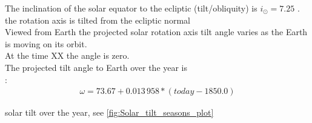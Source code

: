 The inclination of the solar equator to the ecliptic (tilt/obliquity) is $i_\odot = 7.25$\textdegree{} \citep{USNO2015}.\\	%

the rotation axis is tilted from the ecliptic normal\\


Viewed from Earth the projected solar rotation axis tilt angle varies as the Earth is moving on its orbit.\\

At the time XX the angle is zero.\\

The projected tilt angle to Earth over the year is\\

% 
% 

\citet{Hapgood1992}:
\begin{align}
	\omega = 73.67 + 0.013\,958 * (today - 1850.0)	%
\end{align}
% 
% 


% 

solar tilt over the year, see \autoref{fig:Solar_tilt_seasons_plot}
\begin{figure}[htb]
\end{figure}


